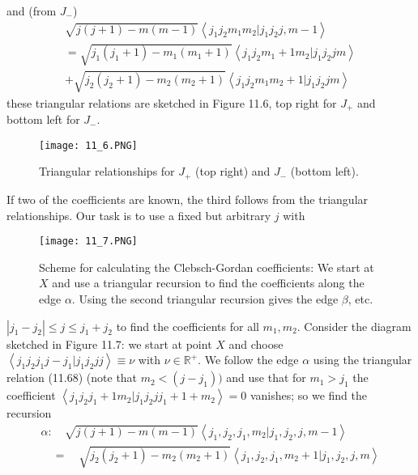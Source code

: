 and (from $J_−$)
\begin{equation}
\begin{aligned} \sqrt{j(j+1)-m(m-1)}\left\langle j_{1} j_{2} m_{1} m_{2} | j_{1} j_{2} j, m-1\right\rangle \\=\sqrt{j_{1}\left(j_{1}+1\right)-m_{1}\left(m_{1}+1\right)}\left\langle j_{1} j_{2} m_{1}+1 m_{2} | j_{1} j_{2} j m\right\rangle \\+\sqrt{j_{2}\left(j_{2}+1\right)-m_{2}\left(m_{2}+1\right)}\left\langle j_{1} j_{2} m_{1} m_{2}+1 | j_{1} j_{2} j m\right\rangle \end{aligned}
\end{equation}
these triangular relations are sketched in Figure 11.6, top right for $J_+$ and bottom left for $J_-$.
\begin{figure}[ht]
        \centering
        \texttt{[image: 11\_6.PNG]}
        \caption{Triangular relationships for $J_+$ (top right) and $J_−$ (bottom left).}
\end{figure}
If two of the coefficients are known, the third follows from the triangular relationships. Our task is to use a fixed but arbitrary $j$ with
\begin{figure}[ht]
        \centering
        \texttt{[image: 11\_7.PNG]}
        \caption{Scheme for calculating the Clebsch-Gordan coefficients: We start at $X$ and use a triangular recursion to find the coefficients along the edge $\alpha$. Using the second triangular recursion gives the edge $\beta$, etc.}
\end{figure}
$\left|j_{1}-j_{2}\right| \leq j \leq j_{1}+j_{2}$ to find the coefficients for all $m_1, m_2$. Consider the diagram sketched in Figure 11.7: we start at point $X$ and choose $\left\langle j_{1} j_{2} j_{1} j-j_{1} | j_{1} j_{2} j j\right\rangle \equiv \nu$ with $\nu\in\mathbb{R}^+$. We follow the edge $\alpha$ using the triangular relation (11.68) (note that $m_2 <(j - j_1))$ and use that for $m_1> j_1$ the coefficient $\left\langle j_{1} j_{2} j_{1}+1 m_{2} | j_{1} j_{2} j j_{1}+1+m_{2}\right\rangle= 0$ vanishes; so we find the recursion
\begin{equation}
\begin{array}{l}{\alpha: \quad \sqrt{j(j+1)-m(m-1)}\left\langle j_{1}, j_{2}, j_{1}, m_{2} | j_{1}, j_{2}, j, m-1\right\rangle} \\ {\quad=\quad \sqrt{j_{2}\left(j_{2}+1\right)-m_{2}\left(m_{2}+1\right)}\left\langle j_{1}, j_{2}, j_{1}, m_{2}+1 | j_{1}, j_{2}, j, m\right\rangle}\end{array}
\end{equation}
